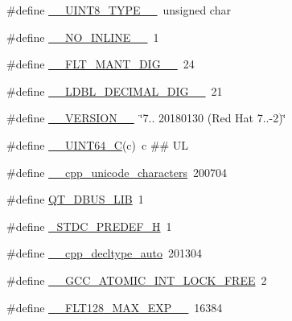 \begin{DoxyCompactItemize}
\item 
\#define \hyperlink{cmake-build-debug_2babel__client__autogen_2moc__predefs_8h_a0f22edb92c4da8029783c424962ac30d}{\+\_\+\+\_\+\+U\+I\+N\+T8\+\_\+\+T\+Y\+P\+E\+\_\+\+\_\+}~unsigned char
\item 
\#define \hyperlink{cmake-build-debug_2babel__client__autogen_2moc__predefs_8h_a7a76473a66d022aee2c9f661405d8fbb}{\+\_\+\+\_\+\+N\+O\+\_\+\+I\+N\+L\+I\+N\+E\+\_\+\+\_\+}~1
\item 
\#define \hyperlink{cmake-build-debug_2babel__client__autogen_2moc__predefs_8h_aeacc238625932b11e6cda685357dd678}{\+\_\+\+\_\+\+F\+L\+T\+\_\+\+M\+A\+N\+T\+\_\+\+D\+I\+G\+\_\+\+\_\+}~24
\item 
\#define \hyperlink{cmake-build-debug_2babel__client__autogen_2moc__predefs_8h_acff705a6de0de8303f2394603bbcdb90}{\+\_\+\+\_\+\+L\+D\+B\+L\+\_\+\+D\+E\+C\+I\+M\+A\+L\+\_\+\+D\+I\+G\+\_\+\+\_\+}~21
\item 
\#define \hyperlink{cmake-build-debug_2babel__client__autogen_2moc__predefs_8h_a5b753f1dbbed79a7126b24ca512246d5}{\+\_\+\+\_\+\+V\+E\+R\+S\+I\+O\+N\+\_\+\+\_\+}~\char`\"{}7.. 20180130 (Red Hat 7..-\/2)\char`\"{}
\item 
\#define \hyperlink{cmake-build-debug_2babel__client__autogen_2moc__predefs_8h_a405cee4934ed56c9a4aa4e7dc4380bd2}{\+\_\+\+\_\+\+U\+I\+N\+T64\+\_\+C}(c)~c \#\# UL
\item 
\#define \hyperlink{cmake-build-debug_2babel__client__autogen_2moc__predefs_8h_a7cb6a2aeb6e528ac59bedb98ebeac198}{\+\_\+\+\_\+cpp\+\_\+unicode\+\_\+characters}~200704
\item 
\#define \hyperlink{cmake-build-debug_2babel__client__autogen_2moc__predefs_8h_a9ef31d35ae61ad3d391d447012dc67f5}{Q\+T\+\_\+\+D\+B\+U\+S\+\_\+\+L\+IB}~1
\item 
\#define \hyperlink{cmake-build-debug_2babel__client__autogen_2moc__predefs_8h_a198efb9bd9b8de1c44f470b6c6ddf69d}{\+\_\+\+S\+T\+D\+C\+\_\+\+P\+R\+E\+D\+E\+F\+\_\+H}~1
\item 
\#define \hyperlink{cmake-build-debug_2babel__client__autogen_2moc__predefs_8h_a5922e567fc671cc2985da95b33544c16}{\+\_\+\+\_\+cpp\+\_\+decltype\+\_\+auto}~201304
\item 
\#define \hyperlink{cmake-build-debug_2babel__client__autogen_2moc__predefs_8h_ab6ba7de2838beb20b1eaca71c062c8e2}{\+\_\+\+\_\+\+G\+C\+C\+\_\+\+A\+T\+O\+M\+I\+C\+\_\+\+I\+N\+T\+\_\+\+L\+O\+C\+K\+\_\+\+F\+R\+EE}~2
\item 
\#define \hyperlink{cmake-build-debug_2babel__client__autogen_2moc__predefs_8h_a6c9626baf058ab78573627fb75c75915}{\+\_\+\+\_\+\+F\+L\+T128\+\_\+\+M\+A\+X\+\_\+\+E\+X\+P\+\_\+\+\_\+}~16384

\end{DoxyCompactItemize}
